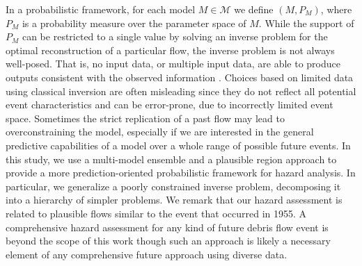 \documentclass[nhess, manuscript]{copernicus}
\begin{document}
In a probabilistic framework, for each model $M\in\mathcal M$ we define $\left(M, P_{M}\right)$, where $P_M$ is a probability measure over the parameter space of $M$. While the support of $P_M$ can be restricted to a single value by solving an inverse problem for the optimal reconstruction of a particular flow, the inverse problem is not always well-posed. That is, no input data, or multiple input data, are able to produce outputs consistent with the observed information \citep{Tarantola1982,  Tarantola1987}. Choices based on limited data using classical inversion are often misleading since they do not reflect all potential event characteristics and can be error-prone, due to incorrectly limited event space. Sometimes the strict replication of a past flow may lead to overconstraining the model, especially if we are interested in the general predictive capabilities of a model over a whole range of possible future events. In this study, we use a multi-model ensemble and a plausible region approach to provide a more prediction-oriented probabilistic framework for hazard analysis. In particular, we generalize a poorly constrained inverse problem, decomposing it into a hierarchy of simpler problems. We remark that our hazard assessment is related to plausible flows similar to the event that occurred in 1955. A comprehensive hazard assessment for any kind of future debris flow event is beyond the scope of this work though such an approach is likely a necessary element of any comprehensive future approach using diverse data.
\end{document}
